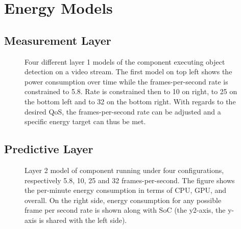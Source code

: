 \section{Energy Models}

\subsection{Measurement Layer}

\begin{figure}[p]
    \begin{minipage}{.93\textwidth}
    \centering
    \selectfont
    \hspace*{20ex}
    
    \caption{Four different layer 1 models of the  component executing object detection on a video stream. The first model on top left shows the power consumption over time while the frames-per-second rate is constrained to 5.8. Rate is constrained then to 10 on right, to 25 on the bottom left and to 32 on the bottom right. With regards to the desired QoS, the frames-per-second rate can be adjusted and a specific energy target can thus be met.} 
    \label{fig:darknet-layer1}
    \end{minipage}
\end{figure}


\subsection{Predictive Layer}


\begin{figure}[p]
    \centering
    \selectfont
    
    \caption{Layer 2 model of  component running under four configurations, respectively 5.8, 10, 25 and 32 frames-per-second. The figure shows the per-minute energy consumption in terms of CPU, GPU, and overall. On the right side, energy consumption for any possible frame per second rate is shown along with SoC (the y2-axis, the y-axis is shared with the left side).}
    \label{fig:darknet-layer2}
  \end{figure}

